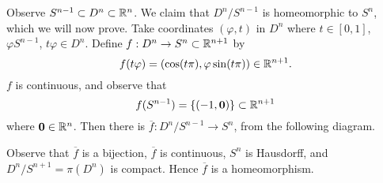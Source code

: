 \begin{example}[]
	Observe $S^{n-1} \subset D^n \subset \mathbb{R}^n$.
	We claim that $D^n/S^{n-1}$ is homeomorphic to $S^n$,
	which we will now prove.
	Take coordinates $(\varphi, t)$ in $D^n$ where $t \in [0,1]$,
	$\varphi S^{n-1}$, $t\varphi \in D^n$.
	Define
	$
		f: D^n \to S^n \subset \mathbb{R}^{n+1}
	$
	by
	\[
		f(t\varphi) = \left( 
			\cos(t\pi), \varphi \sin(t\pi) 
		\right) \in \mathbb{R}^{n+1}.
	\]
	$f$ is continuous, and observe that
	\[
		f(S^{n-1}) = \left\{
			(-1, \bm 0)
		\right\} \subset \mathbb{R}^{n+1}
	\]
	where $\bm 0 \in \mathbb{R}^n$.
	Then there is $\overline f: D^n/S^{n-1} \to S^n$, from the following
	diagram.
	\begin{center}
	\end{center}
	Observe that $\overline f$ is a bijection, $\overline f$ is continuous,
	$S^n$ is Hausdorff, and $D^n/S^{n+1} = \pi(D^n)$ is compact.
	Hence $\overline f$ is a homeomorphism.
\end{example}

